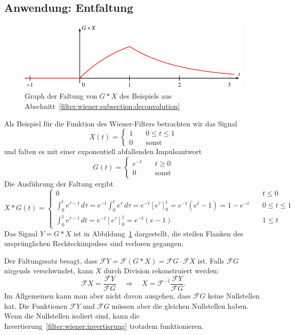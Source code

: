 \subsection{Anwendung: Entfaltung
\label{filter:wiener:subsection:deconvolution}}
\begin{figure}
\centering
\includegraphics{8-filter/images/faltung.pdf}
\caption{Graph der Faltung von $G*X$ des Beispiels aus
Abschnitt~\ref{filter:wiener:subsection:deconvolution}
\label{filter:wiener:faltung:graph}}
\end{figure}
Als Beispiel für die Funktion des Wiener-Filters betrachten wir das Signal 
\[
X(t) = \begin{cases}
1&\quad 0\le t\le 1\\
0&\quad\text{sonst}
\end{cases}
\]
und falten es mit einer exponentiell abfallenden Impulsantwort
\[
G(t)
=
\begin{cases}
e^{-t}&\quad t \ge 0\\
0&\quad \text{sonst}
\end{cases}
\]
Die Ausführung der Faltung ergibt
\begin{equation}
X*G(t)
=
\begin{cases}
0&\quad t\le 0
\\[10pt]
\displaystyle
\int_0^t e^{\tau-t}\,d\tau
=
e^{-t}
\int_0^t e^{\tau}\,d\tau
=
e^{-t}[e^\tau]_0^t
=
e^{-t}(e^t-1)
=
1-e^{-t}
&\quad 0\le t\le 1
\\[10pt]
\displaystyle
\int_0^1 e^{\tau-t}\,dt
=
e^{-t}[e^\tau]_0^1
=
e^{-t}(e-1)
&\quad 1\le t
\end{cases}
\end{equation}
Das Signal $Y=G*X$ ist in Abbildung~\ref{filter:wiener:faltung:graph}
dargestellt, die steilen Flanken des ursprünglichen Rechteckimpulses
sind verloren gegangen.

Der Faltungssatz besagt, dass
$\mathcal{F}Y= \mathcal{F} (G*X) = \mathcal{F}G \cdot \mathcal{F}X$
ist.
Falls $\mathcal{F}G$ nirgends verschwindet, kann $X$ durch Division 
rekonstruiert werden:
\begin{equation}
\mathcal{F}X
=
\frac{\mathcal{F}Y}{\mathcal{F}G}
\quad\Rightarrow\quad
X=\mathcal{F}^{-1}
\frac{\mathcal{F}Y}{\mathcal{F}G}.
\label{filter:wiener:invertierung}
\end{equation}
Im Allgemeinen kann man aber nicht davon ausgehen, dass $\mathcal{F}G$
keine Nullstellen hat.
Die Funktionen $\mathcal{F}Y$ und $\mathcal{F}G$ müssen aber die gleichen 
Nullstellen haben.
Wenn die Nullstellen isoliert sind, kann die
Invertierung~\eqref{filter:wiener:invertierung} trotzdem funktionieren.

